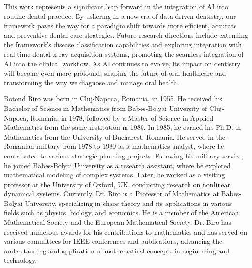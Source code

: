 \documentclass[journal,twoside,web]{ieeecolor}
\begin{document}
This work represents a significant leap forward in the integration of AI into routine dental practice. By ushering in a new era of data-driven dentistry, our framework paves the way for a paradigm shift towards more efficient, accurate and preventive dental care strategies.  Future research directions include extending the framework's disease classification capabilities and exploring integration with real-time dental x-ray acquisition systems, promoting the seamless integration of AI into the clinical workflow. As AI continues to evolve, its impact on dentistry will become even more profound, shaping the future of oral healthcare and transforming the way we diagnose and manage oral health.










\begin{IEEEbiography}{Botond Biro} was born in Cluj-Napoca, Romania, in 1955. He received his Bachelor of Science in Mathematics from Babes-Bolyai University of Cluj-Napoca, Romania, in 1978, followed by a Master of Science in Applied Mathematics from the same institution in 1980. In 1985, he earned his Ph.D. in Mathematics from the University of Bucharest, Romania.
    He served in the Romanian military from 1978 to 1980 as a mathematics analyst, where he contributed to various strategic planning projects. Following his military service, he joined Babes-Bolyai University as a research assistant, where he explored mathematical modeling of complex systems. Later, he worked as a visiting professor at the University of Oxford, UK, conducting research on nonlinear dynamical systems.
    Currently, Dr. Biro is a Professor of Mathematics at Babes-Bolyai University, specializing in chaos theory and its applications in various fields such as physics, biology, and economics. He is a member of the American Mathematical Society and the European Mathematical Society.
    Dr. Biro has received numerous awards for his contributions to mathematics and has served on various committees for IEEE conferences and publications, advancing the understanding and application of mathematical concepts in engineering and technology.
\end{IEEEbiography}
\end{document}
